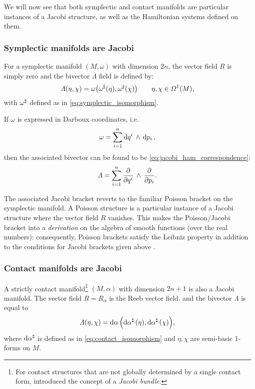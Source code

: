 We will now see that both symplectic and contact manifolds are particular instances of a Jacobi structure, as well as the Hamiltonian systems defined on them.

\subsubsection{Symplectic manifolds are Jacobi}
For a symplectic manifold \((M, \omega)\) with dimension \(2n\), the vector field \(R\) is simply zero and the bivector \(\Lambda\) field is defined by:
\begin{equation}
     \Lambda(\eta, \chi) = \omega\qty(\omega^\sharp(\eta), \omega^\sharp(\chi)) \qquad \eta, \chi \in \Omega^{1}(M),
\end{equation}
with \(\omega^\sharp\) defined as in \cref{eq:symplectic_isomorphism}. 

If \(\omega\) is expressed in Darboux coordinates, i.e.
\begin{equation}
     \omega = \sum^n_{i = 1}  \dd{q^i}\,\wedge\,\dd{p_i} ,
\end{equation}
then the associated bivector can be found to be \cref{eq:jacobi_ham_correspondence}:
\begin{equation}
     \Lambda = \sum^n_{i = 1}  \pdv{}{q^i}\,\wedge\,\pdv{}{p_i} .
\end{equation}

The associated Jacobi bracket reverts to the familiar Poisson bracket on the symplectic manifold. A Poisson structure is a particular instance of a Jacobi structure where the vector field \(R\) vanishes. This makes the Poisson/Jacobi bracket into a \emph{derivation} on the algebra of smooth functions (over the real numbers): consequently, Poisson brackets satisfy the Leibniz property in addition to the conditions for Jacobi brackets given above \cite{marle1991}.

\subsubsection{Contact manifolds are Jacobi}
A strictly contact manifold\footnote{For contact structures that are not globally determined by a single contact form, \citet{marle1991} introduced the concept of a \emph{Jacobi bundle}.} \((M, \alpha)\) with dimension \(2n + 1\) is also a Jacobi manifold. The vector field \(R = R_\alpha\) is the Reeb vector field. 
and the bivector \(\Lambda\) is equal to
\begin{equation}
     \Lambda(\eta, \chi) = \dd{\alpha}\qty(\dd{\alpha}^\sharp(\eta), \dd{\alpha}^\sharp(\chi)),
\end{equation}
where \(\dd{\alpha}^\sharp\) is defined as in \cref{eq:contact_isomorphism} and \(\eta,\chi\) are semi-basic 1-forms on \(M\).

